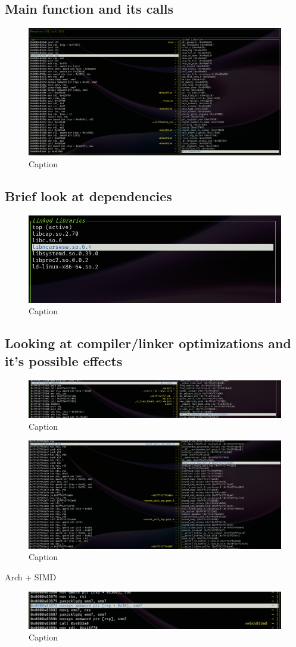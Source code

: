 \subsection{Main function and its calls}

\begin{figure}
    \centering
    \includegraphics[width=0.5\linewidth]{tui-function-select.png}
    \caption{Caption}
    \label{fig:enter-label}
\end{figure}

\subsection{Brief look at dependencies}

\begin{figure}
    \centering
    \includegraphics[width=0.5\linewidth]{tui-lib-select.png}
    \caption{Caption}
    \label{fig:enter-label}
\end{figure}

\subsection{Looking at compiler/linker optimizations and it's possible effects}

\begin{figure}
    \centering
    \includegraphics[width=0.5\linewidth]{cold-starts.png}
    \caption{Caption}
    \label{fig:enter-label}
\end{figure}

\begin{figure}
    \centering
    \includegraphics[width=0.5\linewidth]{function-parts.png}
    \caption{Caption}
    \label{fig:enter-label}
\end{figure}

Arch + SIMD
\begin{figure}
    \centering
    \includegraphics[width=0.5\linewidth]{arch-specific-instruction.png}
    \caption{Caption}
    \label{fig:enter-label}
\end{figure}